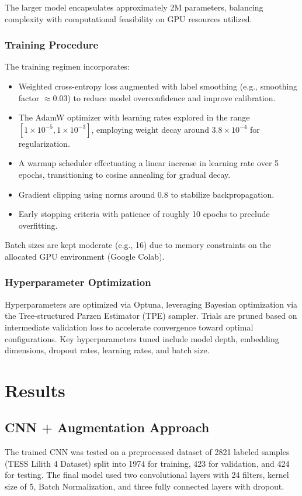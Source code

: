 \documentclass[letterpaper]{article} %
\begin{document}
The larger model encapsulates approximately 2M parameters, balancing complexity with computational feasibility on GPU resources utilized.

\subsubsection*{Training Procedure}

The training regimen incorporates:

\begin{itemize}
    \item Weighted cross-entropy loss augmented with label smoothing (e.g., smoothing factor \(\approx 0.03\)) to reduce model overconfidence and improve calibration.
    \item The AdamW optimizer with learning rates explored in the range \([1\times10^{-5}, 1\times10^{-3}]\), employing weight decay around \(3.8 \times 10^{-4}\) for regularization.
    \item A warmup scheduler effectuating a linear increase in learning rate over 5 epochs, transitioning to cosine annealing for gradual decay.
    \item Gradient clipping using norms around 0.8 to stabilize backpropagation.
    \item Early stopping criteria with patience of roughly 10 epochs to preclude overfitting.
\end{itemize}

Batch sizes are kept moderate (e.g., 16) due to memory constraints on the allocated GPU environment (Google Colab).

\subsubsection*{Hyperparameter Optimization}
Hyperparameters are optimized via Optuna, leveraging Bayesian optimization via the Tree-structured Parzen Estimator (TPE) sampler. Trials are pruned based on intermediate validation loss to accelerate convergence toward optimal configurations. Key hyperparameters tuned include model depth, embedding dimensions, dropout rates, learning rates, and batch size.

\section*{Results}
\subsection {CNN + Augmentation Approach}
The trained CNN was tested on a preprocessed dataset of 2821 labeled samples (TESS Lilith 4 Dataset) split into 1974 for training, 423 for validation, and 424 for testing. The final model used two convolutional layers with 24 filters, kernel size of 5, Batch Normalization, and three fully connected layers with dropout.
\end{document}
